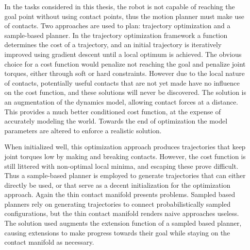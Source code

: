 \documentclass[../thesis.tex]{subfiles}
\begin{document}
In the tasks considered in this thesis, the robot is not capable of reaching the goal point without using contact points, thus the motion planner must make use of contacts.
Two approaches are used to plan: trajectory optimization and a sample-based planner.
In the trajectory optimization framework a function determines the cost of a trajectory, and an initial trajectory is iteratively improved using gradient descent until a local optimum is achieved.
The obvious choice for a cost function would penalize not reaching the goal and penalize joint torques, either through soft or hard constraints.
However due to the local nature of contacts, potentially useful contacts that are not yet made have no influence on the cost function, and these solutions will never be discovered.
The solution is an augmentation of the dynamics model, allowing contact forces at a distance.
This provides a much better conditioned cost function, at the expense of accurately modeling the world.
Towards the end of optimization the model parameters are altered to enforce a realistic solution.

When initialized well, this optimization approach produces trajectories that keep joint torques low by making and breaking contacts.
However, the cost function is still littered with non-optimal local minima, and escaping these prove difficult.
Thus a sample-based planner is employed to generate trajectories that can either directly be used, or that serve as a decent initialization for the optimization approach.
Again the thin contact manifold presents problems.
Sampled based planners rely on generating trajectories to connect probabilistically sampled configurations, but the thin contact manifold renders naive approaches useless.
The solution used augments the extension function of a sampled based planner, causing extensions to make progress towards their goal while staying on the contact manifold as necessary.
\end{document}
